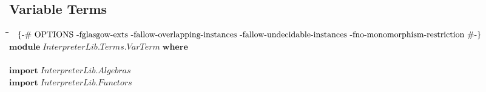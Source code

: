 \documentclass[10pt]{article}
\newlength{\lwidth}\setlength{\lwidth}{4.5cm}
\newlength{\cwidth}\setlength{\cwidth}{8mm} %
\newcommand{\Conid}[1]{\mathit{#1}}
\begin{document}
\subsection{Variable Terms}
\begin{tabbing}
\qquad\=\hspace{\lwidth}\=\hspace{\cwidth}\=\+\kill
${\mbox{\enskip\{-\# OPTIONS -fglasgow-exts -fallow-overlapping-instances -fallow-undecidable-instances -fno-monomorphism-restriction  \#-\}\enskip}}$\\
${\mathbf{module}\;\Conid{\Conid{InterpreterLib}.\Conid{Terms}.VarTerm}\;\mathbf{where}}$\\
${}$\\
${\mathbf{import}\;\Conid{\Conid{InterpreterLib}.Algebras}}$\\
${\mathbf{import}\;\Conid{\Conid{InterpreterLib}.Functors}}$
\end{tabbing}
\end{document}
